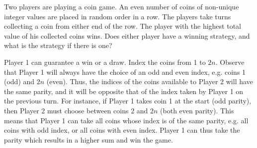 \begin{problem}
    Two players are playing a coin game. An even number of coins of non-unique integer values are placed in random order in a row. The players take turns collecting a coin from either end of the row. The player with the highest total value of his collected coins wins. Does either player have a winning strategy, and what is the strategy if there is one?
\end{problem}
\begin{solution}
    Player 1 can guarantee a win or a draw. Index the coins from 1 to $2n$. Observe that Player 1 will always have the choice of an odd and even index, e.g. coins 1 (odd) and $2n$ (even). Thus, the indices of the coins available to Player 2 will have the same parity, and it will be opposite that of the index taken by Player 1 on the previous turn. For instance, if Player 1 takes coin 1 at the start (odd parity), then Player 2 must choose between coins 2 and $2n$ (both even parity). This means that Player 1 can take all coins whose index is of the same parity, e.g. all coins with odd index, or all coins with even index. Player 1 can thus take the parity which results in a higher sum and win the game.
\end{solution}